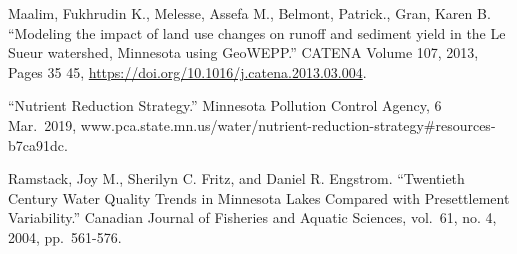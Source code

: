 \documentclass[12pt,]{article}
\begin{document}
Maalim, Fukhrudin K., Melesse, Assefa M., Belmont, Patrick., Gran, Karen
B. ``Modeling the impact of land use changes on runoff and sediment
yield in the Le Sueur watershed, Minnesota using GeoWEPP.'' CATENA
Volume 107, 2013, Pages 35 45,
\url{https://doi.org/10.1016/j.catena.2013.03.004}.

``Nutrient Reduction Strategy.'' Minnesota Pollution Control Agency, 6
Mar.~2019,
www.pca.state.mn.us/water/nutrient-reduction-strategy\#resources-b7ca91dc.

Ramstack, Joy M., Sherilyn C. Fritz, and Daniel R. Engstrom. ``Twentieth
Century Water Quality Trends in Minnesota Lakes Compared with
Presettlement Variability.'' Canadian Journal of Fisheries and Aquatic
Sciences, vol.~61, no. 4, 2004, pp.~561-576.
\end{document}
